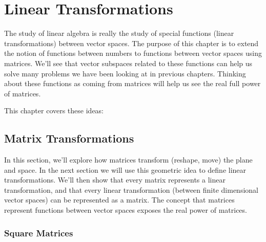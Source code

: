 \chapter{Linear Transformations}

The study of linear algebra is really the study of special functions (linear transformations) between vector spaces.  The purpose of this chapter is to extend the notion of functions between numbers to functions between vector spaces using matrices.  We'll see that vector subspaces related to these functions can help us solve many problems we have been looking at in previous chapters.  Thinking about these functions as coming from matrices will help us see the real full power of matrices.

This chapter covers these ideas:


\section{Matrix Transformations}

In this section, we'll explore how matrices transform (reshape, move) the plane and space.  In the next section we will use this geometric idea to define linear transformations.  We'll then show that every matrix represents a linear transformation, and that every linear transformation (between finite dimensional vector spaces) can be represented as a matrix.  The concept that matrices represent functions between vector spaces exposes the real power of matrices.

\subsection{Square Matrices}


